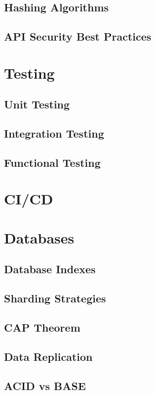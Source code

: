 \documentclass[a4paper]{article}
\begin{document}
    \subsection{Hashing Algorithms}
    \subsection{API Security Best Practices}

    \newpage
    \section{Testing}
    \subsection{Unit Testing}
    \subsection{Integration Testing}
    \subsection{Functional Testing}
    
    \newpage
    \section{CI/CD}
    
    \newpage
    \section{Databases}
    \subsection{Database Indexes}
    \subsection{Sharding Strategies}
    \subsection{CAP Theorem}
    \subsection{Data Replication}
    \subsection{ACID vs BASE}
\end{document}
